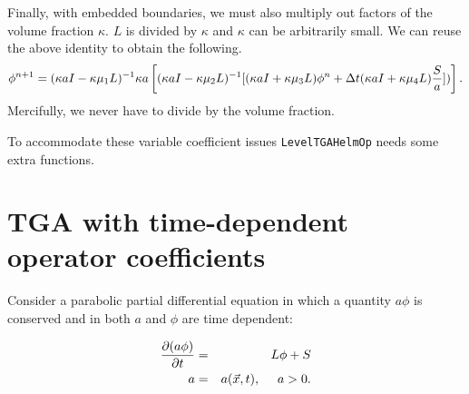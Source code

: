 Finally, with embedded boundaries, we must also multiply out factors
of the volume fraction $\kappa$.   $L$ is divided by $\kappa$ and
$\kappa$ can be arbitrarily small.   We can reuse the above identity
to obtain the following.
$$
\phi^{n+1}=(\kappa a I - \kappa \mu_1 L)^{-1}\kappa a \left[(\kappa a I - \kappa \mu_2 L)^{-1}
         [ (\kappa a I + \kappa \mu_3 L) \phi^n +        \Delta t (\kappa  a I + \kappa \mu_4 L)\frac{S}{a}]) \right].
$$
Mercifully, we never have to divide by the volume fraction.

To accommodate these variable coefficient issues {\tt LevelTGAHelmOp} needs
some extra functions.


\section{TGA with time-dependent operator coefficients}

Consider a parabolic partial differential equation in which a quantity 
$a \phi$ is conserved and in both $a$ and $\phi$ are time dependent:

\begin{eqnarray}
\frac{\partial (a \phi)}{\partial t} &=& L \phi + S \label{eqn:timeDepNonUnityParabolicEqn} \\
a &=& a(\vec{x}, t), ~~~~ a > 0. \notag
\end{eqnarray}

